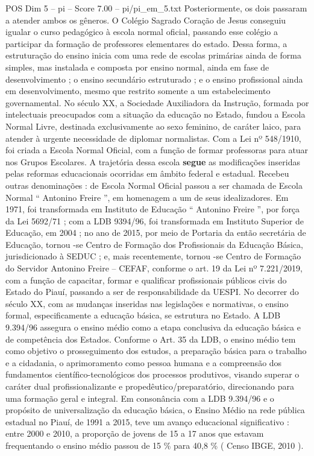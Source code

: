\begin{textsample}{POS Dim 5 – pi – Score 7.00 – pi/pi\_em\_5.txt}
Posteriormente, os dois passaram a atender ambos os gêneros.
O Colégio Sagrado Coração de Jesus conseguiu igualar o curso pedagógico à escola normal oficial, passando esse colégio a participar da formação de professores elementares do estado.
Dessa forma, a estruturação do ensino inicia com uma rede de escolas primárias ainda de forma simples, mas instalada e composta por ensino normal, ainda em fase de desenvolvimento ; o ensino secundário estruturado ; e o ensino profissional ainda em desenvolvimento, mesmo que restrito somente a um estabelecimento governamental.
No século XX, a Sociedade Auxiliadora da Instrução, formada por intelectuais preocupados com a situação da educação no Estado, fundou a Escola Normal Livre, destinada exclusivamente ao sexo feminino, de caráter laico, para atender à urgente necessidade de diplomar normalistas.
Com a Lei nº 548/1910, foi criada a Escola Normal Oficial, com a função de formar professoras para atuar nos Grupos Escolares.
A trajetória dessa escola \textbf{segue} as modificações inseridas pelas reformas educacionais ocorridas em âmbito federal e estadual.
Recebeu outras denominações : de Escola Normal Oficial passou a ser chamada de Escola Normal “ Antonino Freire ”, em homenagem a um de seus idealizadores.
Em 1971, foi transformada em Instituto de Educação “ Antonino Freire ”, por força da Lei 5692/71 ; com a LDB 9394/96, foi transformada em Instituto Superior de Educação, em 2004 ; no ano de 2015, por meio de Portaria da então secretária de Educação, tornou -se Centro de Formação dos Profissionais da Educação Básica, jurisdicionado à SEDUC ; e, mais recentemente, tornou -se Centro de Formação do Servidor Antonino Freire – CEFAF, conforme o art. 19 da Lei nº 7.221/2019, com a função de capacitar, formar e qualificar profissionais públicos civis do Estado do Piauí, passando a ser de responsabilidade da UESPI.
No decorrer do século XX, com as mudanças inseridas nas legislações e normativas, o ensino formal, especificamente a educação básica, se estrutura no Estado.
A LDB 9.394/96 assegura o ensino médio como a etapa conclusiva da educação básica e de competência dos Estados.
Conforme o Art. 35 da LDB, o ensino médio tem como objetivo o prosseguimento dos estudos, a preparação básica para o trabalho e a cidadania, o aprimoramento como pessoa humana e a compreensão dos fundamentos científico-tecnológicos dos processos produtivos, visando superar o caráter dual profissionalizante e propedêutico/preparatório, direcionando para uma formação geral e integral.
Em consonância com a LDB 9.394/96 e o propósito de universalização da educação básica, o Ensino Médio na rede pública estadual no Piauí, de 1991 a 2015, teve um avanço educacional significativo : entre 2000 e 2010, a proporção de jovens de 15 a 17 anos que estavam frequentando o ensino médio passou de 15 \% para 40,8 \% ( Censo IBGE, 2010 ).

\end{textsample}
